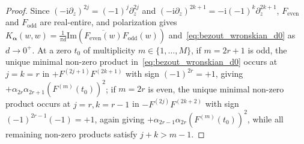 \documentclass[11pt,reqno]{amsart}
\theoremstyle{definition}
\theoremstyle{remark}
\numberwithin{equation}{section}
\newcommand{\ii}{\mathrm{i}}
\newcommand{\Ima}{\mathrm{Im}}
\begin{document}
\begin{proof}
Since $(-\ii\partial_z)^{2j} = (-1)^j\partial_z^{2j}$ and $(-\ii\partial_z)^{2k+1} = -\ii(-1)^k\partial_z^{2k+1}$, $F_{\mathrm{even}}$ and $F_{\mathrm{odd}}$ are real-entire, and polarization gives $K_{\boldsymbol{\alpha}}(w,w) = \frac{1}{\pi d}\Ima(\overline{F_{\mathrm{even}}(w)}F_{\mathrm{odd}}(w))$ and~\eqref{eq:bezout_wronskian_d0} as $d \to 0^+$. At a zero $t_0$ of multiplicity $m \in \{1,\dots,M\}$, if $m = 2r + 1$ is odd, the unique minimal non-zero product in~\eqref{eq:bezout_wronskian_d0} occurs at $j = k = r$ in $+F^{(2j+1)}F^{(2k+1)}$ with sign $(-1)^{2r} = +1$, giving $+\alpha_{2r}\alpha_{2r+1}(F^{(m)}(t_0))^2$; if $m = 2r$ is even, the unique minimal non-zero product occurs at $j = r, k = r - 1$ in $-F^{(2j)}F^{(2k+2)}$ with sign $(-1)^{2r-1}(-1) = +1$, again giving $+\alpha_{2r-1}\alpha_{2r}(F^{(m)}(t_0))^2$, while all remaining non-zero products satisfy $j + k > m - 1$.
\end{proof}
\end{document}
